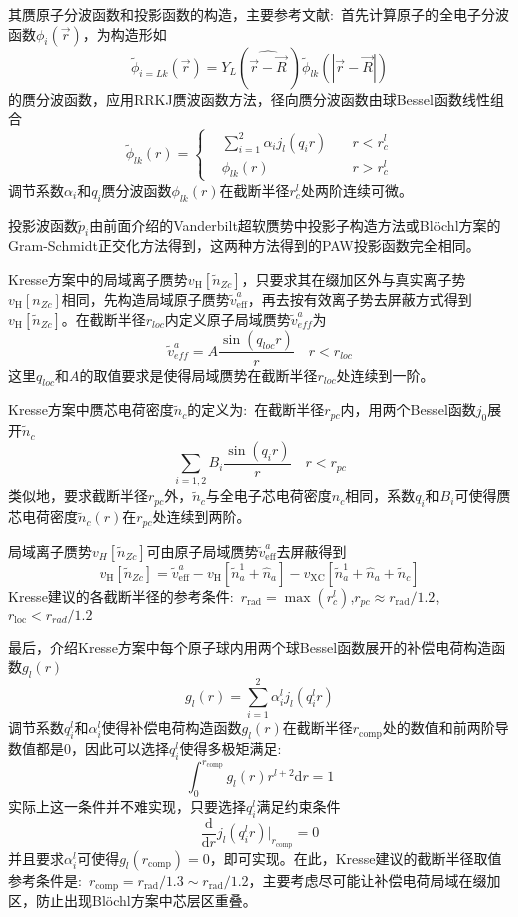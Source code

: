 其赝原子分波函数和投影函数的构造，主要参考文献\cite{JPCM6-8245_1994}:~首先计算原子的全电子分波函数$\phi_i(\vec r)$，为构造形如
	\begin{equation}
		\tilde\phi_{i=Lk}(\vec r)=Y_L(\widehat{\vec r-\vec R}~)\tilde\phi_{lk}(|\vec r-\vec R|)
	\end{equation}
	的赝分波函数，应用\textrm{RRKJ}赝波函数方法，径向赝分波函数由球\textrm{Bessel}函数线性组合
	\begin{equation}
		\tilde\phi_{lk}(r)=\left\{
		\begin{aligned}
			&\sum_{i=1}^2\alpha_ij_l(q_ir)\quad &r<r_c^l\\
			&\phi_{lk}(r)\quad&r>r_c^l
		\end{aligned}
		\right.
	\end{equation}
调节系数$\alpha_i$和$q_i$赝分波函数$\phi_{lk}(r)$在截断半径$r_c^l$处两阶连续可微。

投影波函数$\tilde p_i$由前面介绍的\textrm{Vanderbilt}超软赝势中投影子构造方法或\textrm{Bl\"ochl}方案的\textrm{Gram-Schmidt}正交化方法得到，这两种方法得到的\textrm{PAW}投影函数完全相同。

\textrm{Kresse}方案中的局域离子赝势$v_{\mathrm H}[\tilde n_{Zc}]$，只要求其在缀加区外与真实离子势$v_{\mathrm H}[n_{Zc}]$相同，先构造局域原子赝势$\tilde v_{\mathrm{eff}}^a$，再去按有效离子势去屏蔽方式得到$v_{\mathrm H}[\tilde n_{Zc}]$。在截断半径$r_{loc}$内定义原子局域赝势$\tilde v_{eff}^a$为
$$\tilde v_{eff}^a=A\dfrac{\sin(q_{loc}r)}r\quad r<r_{loc}$$
这里$q_{loc}$和$A$的取值要求是使得局域赝势在截断半径$r_{loc}$处连续到一阶。

\textrm{Kresse}方案中赝芯电荷密度$\tilde n_c$的定义为:~在截断半径$r_{pc}$内，用两个\textrm{Bessel}函数$j_0$展开$\tilde n_c$
$$\sum_{i=1,2}B_i\dfrac{\sin(q_ir)}r\quad r<r_{pc}$$
类似地，要求截断半径$r_{pc}$外，$\tilde n_c$与全电子芯电荷密度$n_c$相同，系数$q_i$和$B_i$可使得赝芯电荷密度$\tilde n_c(r)$在$r_{pc}$处连续到两阶。

局域离子赝势$v_H[\tilde n_{Zc}]$可由原子局域赝势$\tilde v_{\mathrm{eff}}^a$去屏蔽得到
$$v_{\mathrm H}[\tilde n_{Zc}]=\tilde v_{\mathrm{eff}}^a-v_{\mathrm H}[\tilde n_a^1+\hat n_a]-v_{\mathrm{XC}}[\tilde n_a^1+\hat n_a+\tilde n_c]$$
\textrm{Kresse}建议的各截断半径的参考条件:~$r_{\mathrm{rad}}=\max({r_c^l})$,$r_{pc}\approx r_{\mathrm{rad}}/1.2$,$r_{\mathrm{loc}}<r_{rad}/1.2$

最后，介绍\textrm{Kresse}方案中每个原子球内用两个球\textrm{Bessel}函数展开的补偿电荷构造函数$g_l(r)$
$$g_l(r)=\sum_{i=1}^2\alpha_i^lj_l(q_i^lr)$$
调节系数$q_i^l$和$\alpha_i^l$使得补偿电荷构造函数$g_l(r)$在截断半径$r_{\mathrm{comp}}$处的数值和前两阶导数值都是0，因此可以选择$q_i^l$使得多极矩满足:~
$$\int_0^{r_{\mathrm{comp}}}g_l(r)r^{l+2}\mathrm{d}r=1$$
实际上这一条件并不难实现，只要选择$q_i^l$满足约束条件
$$\dfrac{\mathrm{d}}{\mathrm{d}r}j_l(q_i^lr)\bigg|_{r_{\mathrm{comp}}}=0$$
并且要求$\alpha_i^l$可使得$g_l(r_{\mathrm{comp}})=0$，即可实现。在此，\textrm{Kresse}建议的截断半径取值参考条件是:~$r_{\mathrm{comp}}=r_{\mathrm{rad}}/1.3\sim r_{\mathrm{rad}}/1.2$，主要考虑尽可能让补偿电荷局域在缀加区，防止出现\textrm{Bl\"ochl}方案中芯层区重叠。


